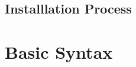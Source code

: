 \documentclass{article}
\begin{document}
\subsection{Installlation Process}


\section {Basic Syntax}
\section {}
\end{document}
